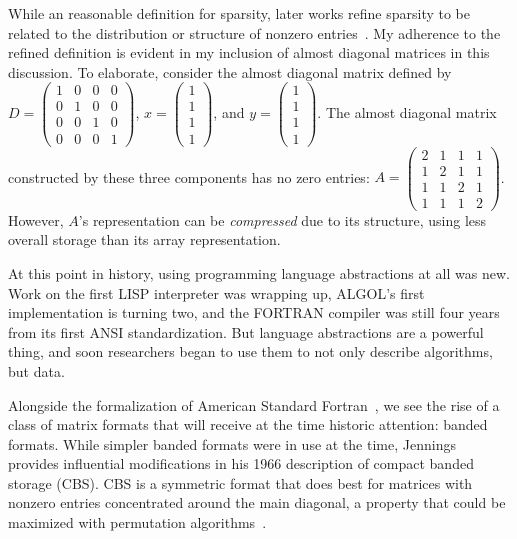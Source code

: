 While an reasonable definition for sparsity, later works refine sparsity to be related to the distribution or structure of nonzero entries~\cite{duff1977survey}.
My adherence to the refined definition is evident in my inclusion of almost diagonal matrices in this discussion. 
To elaborate, consider the almost diagonal matrix defined by $D=\begin{pmatrix}
  1 & 0 & 0 & 0\\
  0 & 1 & 0 & 0\\
  0 & 0 & 1 & 0 \\
  0 & 0 & 0 & 1
\end{pmatrix}$,
$x=\begin{pmatrix}
  1 \\
  1 \\
  1 \\
  1
\end{pmatrix}$, 
and $y=\begin{pmatrix}
  1 \\
  1 \\
  1 \\
  1
\end{pmatrix}$.
The almost diagonal matrix constructed by these three components has no zero entries: $A=\begin{pmatrix}
  2 & 1 & 1 & 1 \\
  1 & 2 & 1 & 1 \\
  1 & 1 & 2 & 1 \\
  1 & 1 & 1 & 2
\end{pmatrix}$.
However, $A$'s representation can be \textit{compressed} due to its structure, using less overall storage than its array representation.

At this point in history, using programming language abstractions at all was new. 
Work on the first LISP interpreter was wrapping up\cite{mccarthy1978history}, ALGOL's first implementation is turning two\cite{proof}, and the FORTRAN compiler was still four years from its first ANSI standardization\cite{proof}. 
But language abstractions are a powerful thing, and soon researchers began to use them to not only describe algorithms, but data.

Alongside the formalization of American Standard Fortran~\cite{ansi1966fortran}, we see the rise of a class of matrix formats that will receive at the time historic attention: banded formats.
While simpler banded formats were in use at the time, Jennings~\cite{jennings1966compact} provides influential modifications in his 1966 description of compact banded storage (CBS).
CBS is a symmetric format that does best for matrices with nonzero entries concentrated around the main diagonal, a property that could be maximized with permutation algorithms~\cite{alway1965algorithm}.

